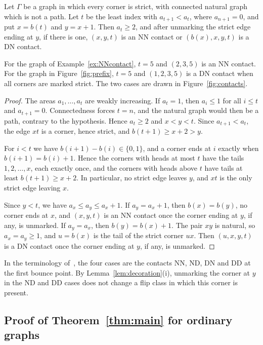 \begin{lemma}\label{lem:firstContact}
Let $\Gamma$ be a graph in which every corner is strict, with connected natural
graph which is not a path.
Let $t$ be the least index with $a_{t+1}<a_t$, where $a_{n+1}=0$, and put
$x=b(t)$ and $y=x+1$.
Then $a_t\geq2$, and after unmarking the strict edge ending at $y$, if there is
one, $(x,y,t)$ is an NN contact or $(b(x),x,y,t)$ is a DN contact.
\end{lemma}

For the graph of Example~\ref{ex:NNcontact}, $t=5$ and $(2,3,5)$ is an NN
contact.  For the graph in Figure~\ref{fig:prefix}, $t=5$ and $(1,2,3,5)$ is a
DN contact when all corners are marked strict.
The two cases are drawn in Figure~\ref{fig:contacts}.

\begin{proof}
The areas $a_1,\dotsc,a_t$ are weakly increasing.
If $a_t=1$, then $a_i\leq1$ for all $i\leq t$ and $a_{t+1}=0$.
Connectedness forces $t=n$, and the natural graph would then be a path,
contrary to the hypothesis.
Hence $a_t\geq2$ and $x<y<t$.
Since $a_{t+1}<a_t$, the edge $xt$ is a corner, hence strict, and
$b(t+1)\geq x+2>y$.

For $i<t$ we have $b(i+1)-b(i)\in\{0,1\}$, and a corner ends at $i$ exactly when
$b(i+1)=b(i)+1$.
Hence the corners with heads at most $t$ have the tails $1,2,\dotsc,x$, each
exactly once, and the corners with heads above $t$ have tails at least
$b(t+1)\geq x+2$.
In particular, no strict edge leaves $y$, and $xt$ is the only strict edge
leaving $x$.

Since $y<t$, we have $a_x\leq a_y\leq a_x+1$.
If $a_y=a_x+1$, then $b(x)=b(y)$, no corner ends at $x$, and $(x,y,t)$ is an NN
contact once the corner ending at $y$, if any, is unmarked.
If $a_y=a_x$, then $b(y)=b(x)+1$.
The pair $xy$ is natural, so $a_x=a_y\geq1$, and $u=b(x)$ is the tail of the
strict corner $ux$.
Then $(u,x,y,t)$ is a DN contact once the corner ending at $y$, if any, is
unmarked.
\end{proof}

In the terminology of~\cite{AlexanderssonSulzgruber2022}, the four cases are
the contacts NN, ND, DN and DD at the first bounce point.
By Lemma~\ref{lem:decoration}(i), unmarking the corner at $y$ in the ND and DD
cases does not change a flip class in which this corner is present.

\subsection{Proof of Theorem~\ref{thm:main} for ordinary graphs}

